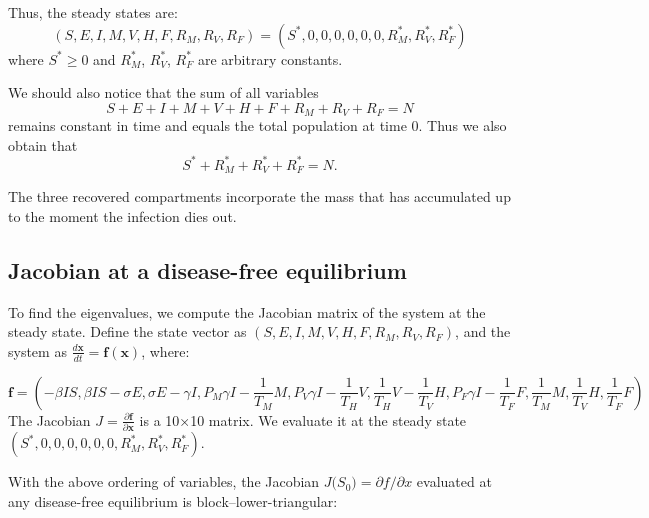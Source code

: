 \documentclass[11pt]{article}
\begin{document}
Thus, the steady states are:
$$(S, E, I, M, V, H, F, R_M, R_V, R_F) = (S^*, 0, 0, 0, 0, 0, 0, R_M^*, R_V^*, R_F^*)$$
where $S^* \geq 0$ and $R_M^*$, $R_V^*$, $R_F^*$ are arbitrary constants. 

We should also notice that the sum of all variables
\begin{equation}\label{e:param1}
S+E+I+M+V+H+F+R_M+R_V+R_F=N
\end{equation}
remains constant in time and equals the total population at time $0$.  Thus we also obtain that 
\[
S^*+R_M^*+R_V^*+R_F^*=N.
\]

The three recovered compartments incorporate the mass that has accumulated up to the moment the infection dies out.

\subsection{Jacobian at a disease-free equilibrium}

To find the eigenvalues, we compute the Jacobian matrix of the system at the steady state. Define the state vector as $(S, E, I, M, V, H, F, R_M, R_V, R_F)$, and the system as $\frac{d\mathbf{x}}{dt} = \mathbf{f}(\mathbf{x})$, where:

$$\mathbf{f} = \left( -\beta I S, \beta I S - \sigma E, \sigma E - \gamma I, P_M \gamma I - \frac{1}{T_M} M, P_V \gamma I - \frac{1}{T_H} V, \frac{1}{T_H} V - \frac{1}{T_V} H, P_F \gamma I - \frac{1}{T_F} F, \frac{1}{T_M} M, \frac{1}{T_V} H, \frac{1}{T_F} F \right)$$
The Jacobian $J = \frac{\partial \mathbf{f}}{\partial \mathbf{x}}$ is a 10×10 matrix. We evaluate it at the steady state $(S^*, 0, 0, 0, 0, 0, 0, R_M^*, R_V^*, R_F^*)$.

With the above ordering of variables, the Jacobian \(J\bigl(S_0\bigr)=\partial f/\partial x\) evaluated at any disease-free equilibrium is block--lower-triangular:
\end{document}

